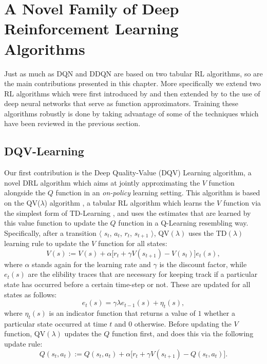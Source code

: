 \section{A Novel Family of Deep Reinforcement Learning Algorithms}
\label{sec:dqv_family}

Just as much as DQN and DDQN are based on two tabular RL algorithms, so are the main contributions presented in this chapter. More specifically we extend two RL algorithms which were first introduced by \citet{wiering2005qv} and then extended by \citet{wiering2009qv} to the use of deep neural networks that serve as function approximators. Training these algorithms robustly is done by taking advantage of some of the techniques which have been reviewed in the previous section.

\subsection{DQV-Learning}
Our first contribution is the Deep Quality-Value (DQV) Learning algorithm, a novel DRL algorithm which aims at jointly approximating the $V$ function alongside the $Q$ function in an \textit{on-policy} learning setting. This algorithm is based on the QV($\lambda$) algorithm \cite{wiering2005qv}, a tabular RL algorithm which learns the $V$ function via the simplest form of TD-Learning \cite{sutton1988learning}, and uses the estimates that are learned by this value function to update the $Q$ function in a Q-Learning resembling way. Specifically, after a transition $\langle$ $s_{t}$, $a_{t}$, $r_{t}$, $s_{t+1}$ $\rangle$, QV$(\lambda)$ uses the TD$(\lambda)$ learning rule \cite{sutton1988learning} to update the $V$ function for all states: 
\begin{equation}
V(s):= V(s) + \alpha \big[ r_{t} + \gamma V(s_{t+1}) - V(s_t) \big] e_{t}(s),
\label{eq:qv_lambda_v_update}
\end{equation}
where $\alpha$ stands again for the learning rate and $\gamma$ is the discount factor, while $e_t(s)$ are the elibility traces \cite{peng1994incremental, wiering1998speeding, geist2014off} that are necessary for keeping track if a particular state has occurred before a certain time-step or not. These are updated for all states as follows:  
\begin{equation} 
e_{t}(s) = \gamma \lambda e_{t-1}(s) + \eta_t(s),
\end{equation}
where $\eta_t(s)$ is an indicator function that returns a value of $1$ whether a particular state occurred at time $t$ and $0$ otherwise. Before updating the $V$ function, QV$(\lambda)$ updates the $Q$ function first, and does this via the following update rule:
\begin{equation}
Q(s_{t}, a_{t}):= Q(s_{t}, a_{t}) + \alpha \big[r_{t} + \gamma V(s_{t+1}) - Q(s_{t}, a_{t}) \big].
\label{eq:qv_lambda_q_update}
\end{equation}

